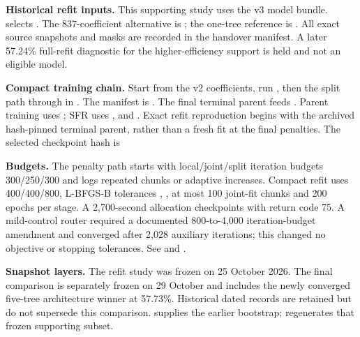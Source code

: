\begin{implementation}
\textbf{Historical refit inputs.} This supporting study uses the v3 model bundle.
 selects
. The 837-coefficient alternative is
; the one-tree reference is
. All exact source snapshots and masks are recorded
in the handover manifest. A later 57.24\% full-refit diagnostic for the
higher-efficiency support is held and not an eligible model.

\textbf{Compact training chain.} Start from the v2 
coefficients, run , then the split path
 through  in .
The manifest is . The final terminal parent
feeds . Parent training uses
; SFR uses
,
 and
. Exact refit reproduction begins with
the archived hash-pinned terminal parent, rather than a fresh fit at the final
penalties. The selected checkpoint hash is
\begin{center}\scriptsize\ttfamily\CompactCheckpointHash\end{center}

\textbf{Budgets.} The penalty path starts with local/joint/split iteration
budgets 300/250/300 and logs repeated chunks or adaptive increases. Compact
refit uses 400/400/800, L-BFGS-B tolerances ,
, at most 100 joint-fit chunks and 200 epochs per stage.
A 2,700-second allocation checkpoints with return code 75. A mild-control
router required a documented 800-to-4,000 iteration-budget amendment and
converged after 2,028 auxiliary iterations; this changed no objective or
stopping tolerances. See  and
.

\textbf{Snapshot layers.} The refit study was frozen on 25 October 2026.
The final comparison is separately frozen on 29 October and includes the
newly converged five-tree architecture winner at 57.73\%. Historical dated
records are retained but do not supersede this comparison.
 supplies the earlier bootstrap;
 regenerates that frozen supporting subset.
\end{implementation}
